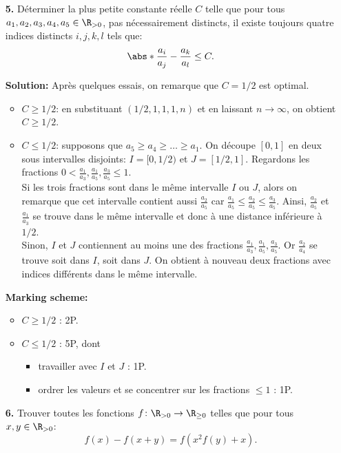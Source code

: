\documentclass[language=german,style=solution]{smo}
\begin{document}
\begin{enumerate}
\item[\textbf{5.}] %
Déterminer la plus petite constante réelle $C$ telle que pour tous $a_1,a_2,a_3,a_4,a_5\in \R_{>0}$, pas nécessairement distincts, il existe toujours quatre indices distincts $i,j,k,l$ tels que:
\[
\abs*{\frac{a_i}{a_j}-\frac{a_k}{a_l}}\leq C.
\]

\textbf{Solution:}
Après quelques essais, on remarque que $C=1/2$ est optimal.
\begin{itemize}
\item $C\geq 1/2$: en substituant $(1/2,1,1,1,n)$ et en laissant $n\rightarrow\infty$, on obtient $C\geq 1/2$.
\item $C\leq 1/2$: supposons que $a_5\geq a_4\geq\ldots\geq a_1$. On découpe $[0,1]$ en deux sous intervalles disjoints: $I=[0,1/2)$ et $J=[1/2,1]$. Regardons les fractions $0<\frac{a_1}{a_3},\frac{a_1}{a_5},\frac{a_3}{a_5}\leq 1$.\\
Si les trois fractions sont dans le même intervalle $I$ ou $J$, alors on remarque que cet intervalle contient aussi $\frac{a_2}{a_5}$ car $\frac{a_1}{a_5}\leq\frac{a_2}{a_5}\leq\frac{a_3}{a_5}$. Ainsi, $\frac{a_2}{a_5}$ et $\frac{a_1}{a_3}$ se trouve dans le même intervalle et donc à une distance inférieure à $1/2$.\\
Sinon, $I$ et $J$ contiennent au moins une des fractions $\frac{a_1}{a_3},\frac{a_1}{a_5},\frac{a_3}{a_5}$. Or $\frac{a_2}{a_4}$ se trouve soit dans $I$, soit dans $J$. On obtient à nouveau deux fractions avec indices différents dans le même intervalle. 
\end{itemize}

\textbf{Marking scheme:}
\begin{itemize}
\item $C\geq 1/2$ : 2P.
\item $C\leq 1/2$ : 5P, dont
\begin{itemize}
\item travailler avec $I$ et $J$ : 1P.
\item ordrer les valeurs et se concentrer sur les fractions $\leq 1$ : 1P.
\end{itemize}
\end{itemize}
\newpage


\item[\textbf{6.}] %
Trouver toutes les fonctions $f\colon\R_{>0}\to\R_{\geq0}$ telles que pour tous  $x,y\in\R_{>0}$:
\[
f(x)-f(x+y)=f(x^2f(y)+x).
\]


\end{enumerate}
\end{document}
